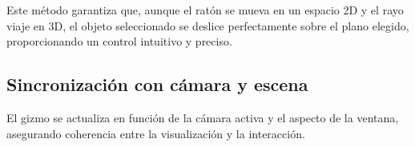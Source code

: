 Este método garantiza que, aunque el ratón se mueva en un espacio 2D y el rayo
viaje en 3D, el objeto seleccionado se deslice perfectamente sobre el plano
elegido, proporcionando un control intuitivo y preciso.

\subsection{Sincronización con cámara y escena}

El gizmo se actualiza en función de la cámara activa y el aspecto de la
ventana, asegurando coherencia entre la visualización y la interacción.